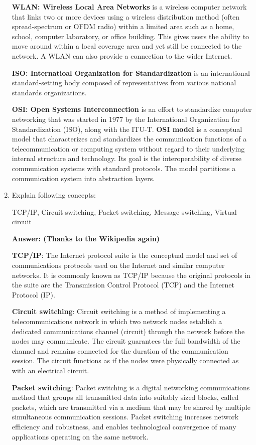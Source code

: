 \begin{enumerate}
	\qquad\textbf{WLAN: Wireless Local Area Networks} is a wireless computer network that links two or more devices using a wireless distribution method (often spread-spectrum or OFDM radio) within a limited area such as a home, school, computer laboratory, or office building. This gives users the ability to move around within a local coverage area and yet still be connected to the network. A WLAN can also provide a connection to the wider Internet.
	
	\qquad \textbf{ISO: Internatioal Organization for Standardization} is an international standard-setting body composed of representatives from various national standards organizations.
	
	\qquad \textbf{OSI: Open Systems Interconnection} is an effort to standardize computer networking that was started in 1977 by the International Organization for Standardization (ISO), along with the ITU-T. \textbf{OSI model} is a conceptual model that characterizes and standardizes the communication functions of a telecommunication or computing system without regard to their underlying internal structure and technology. Its goal is the interoperability of diverse communication systems with standard protocols. The model partitions a communication system into abstraction layers.

	\item Explain following concepts:

    TCP/IP, Circuit switching, Packet switching, Message switching, Virtual circuit
    
    \textbf{Answer: (Thanks to the Wikipedia again)}
	
	\qquad \textbf{TCP/IP}: The Internet protocol suite is the conceptual model and set of communications protocols used on the Internet and similar computer networks. It is commonly known as TCP/IP because the original protocols in the suite are the Transmission Control Protocol (TCP) and the Internet Protocol (IP).

	\qquad \textbf{Circuit switching}: Circuit switching is a method of implementing a telecommunications network in which two network nodes establish a dedicated communications channel (circuit) through the network before the nodes may communicate. The circuit guarantees the full bandwidth of the channel and remains connected for the duration of the communication session. The circuit functions as if the nodes were physically connected as with an electrical circuit.

	\qquad \textbf{Packet switching}: Packet switching is a digital networking communications method that groups all transmitted data into suitably sized blocks, called packets, which are transmitted via a medium that may be shared by multiple simultaneous communication sessions. Packet switching increases network efficiency and robustness, and enables technological convergence of many applications operating on the same network.
	

\end{enumerate}
